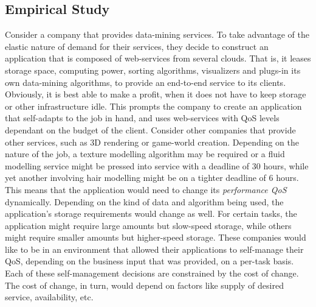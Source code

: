 \documentclass[10pt,journal,compsoc]{IEEEtran}
\begin{document}
\subsection{Empirical Study}
Consider a company that provides data-mining services. To take advantage of the elastic nature of demand for their services, they decide to construct an application that is composed of web-services from several clouds. That is, it leases storage space, computing power, sorting algorithms, visualizers and plugs-in its own data-mining algorithms, to provide an end-to-end service to its clients. Obviously, it is best able to make a profit, when it does not have to keep storage or other infrastructure idle. This prompts the company to create an application that self-adapts to the job in hand, and uses web-services with QoS levels dependant on the budget of the client. Consider other companies that provide other services, such as 3D rendering or game-world creation. Depending on the nature of the job, a texture modelling algorithm may be required or a fluid modelling service might be pressed into service with a deadline of 30 hours, while yet another involving hair modelling might be on a tighter deadline of 6 hours. This means that the application would need to change its \textit{performance QoS} dynamically. Depending on the kind of data and algorithm being used, the application's storage requirements would change as well. For certain tasks, the application might require large amounts but slow-speed storage, while others might require smaller amounts but higher-speed storage. These companies would like to be in an environment that allowed their applications to self-manage their QoS, depending on the business input that was provided, on a per-task basis. Each of these self-management decisions are constrained by the cost of change. The cost of change, in turn, would depend on factors like supply of desired service, availability, etc. 
\end{document}
